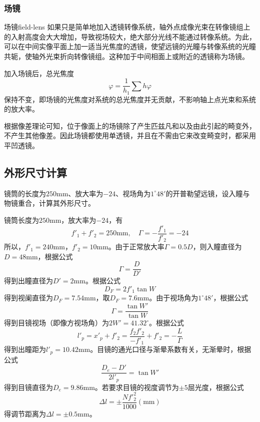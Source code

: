 \subsubsection{场镜}
\begin{definition}{场镜}{field-lens}
	如果只是简单地加入透镜转像系统，轴外点成像光束在转像镜组上的入射高度会大大增加，导致视场较大，绝大部分光线不能通过转像系统。为此，可以在中间实像平面上加一适当光焦度的透镜，使望远镜的光瞳与转像系统的光瞳共轭，使轴外光束折向转像镜组。这种加于中间相面上或附近的透镜称为场镜。
\end{definition}
加入场镜后，总光焦度
\begin{equation}
\varphi=\frac{1}{h_1}\sum h\varphi
\end{equation}
保持不变，即场镜的光焦度对系统的总光焦度并无贡献，不影响轴上点光束和系统的放大率。

根据像差理论可知，位于像面上的场镜除了产生匹兹凡和以及由此引起的畸变外，不产生其他像差。因此场镜都使用单透镜，并且在不需由它来改变畸变时，都采用平凹透镜。

\subsection{外形尺寸计算}
\begin{problem}
	\textbf{\color{red}{（重点）}}镜筒的长度为$250\mathrm{mm}$、放大率为$-24$、视场角为$1^{\circ}48'$的开普勒望远镜，设入瞳与物镜重合，计算其外形尺寸。
\end{problem}
\begin{solution}
	镜筒长度为$250\mathrm{mm}$，放大率为$-24$，有
	\begin{equation}
	f'_1+f'_2=250\mathrm{mm},\quad \varGamma=-\frac{f'_1}{f'_2}=-24 \nonumber
	\end{equation}
	所以，$f'_1=240\mathrm{mm}$，$f'_2=10\mathrm{mm}$。由于正常放大率$\varGamma=0.5D$，则入瞳直径为$D=48\mathrm{mm}$，根据公式
	\begin{equation}
	\varGamma=\frac{D}{D'} \nonumber
	\end{equation}
	得到出瞳直径为$D'=2\mathrm{mm}$。根据公式
	\begin{equation}
	D_F=2f'_1\tan W \nonumber
	\end{equation}
	得到视阑直径为$D_F=7.54\mathrm{mm}$，取$D_F=7.6\mathrm{mm}$。由于视场角为$1^{\circ}48'$，根据公式
	\begin{equation}
	\varGamma=\frac{\tan W'}{\tan W} \nonumber
	\end{equation}
	得到目镜视场（即像方视场角）为$2W'=41.32^{\circ}$。根据公式
	\begin{equation}
	l'_p=x'_p+f'_2=\frac{f_2f'_2}{-f'_1}+f'_2=-\frac{L}{\varGamma} \nonumber
	\end{equation}
	得到出瞳距为$l'_p=10.42\mathrm{mm}$。目镜的通光口径与渐晕系数有关，无渐晕时，根据公式
	\begin{equation}
	\frac{D_e-D'}{2l'_p}=\tan W' \nonumber
	\end{equation}
	得到目镜直径为$D_e=9.86\mathrm{mm}$。若要求目镜的视度调节为$\pm5$屈光度，根据公式
	\begin{equation}
	\Delta l=\pm\frac{Nf'^2_2}{1000}(\mathrm{mm}) \nonumber
	\end{equation}
	得调节距离为$\Delta l=\pm0.5\mathrm{mm}$。
\end{solution}